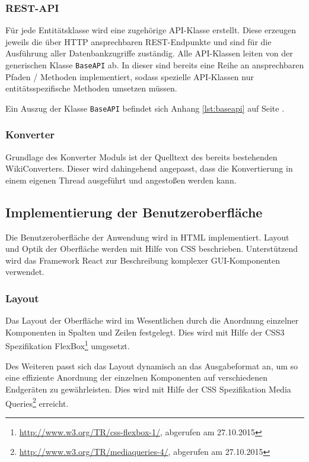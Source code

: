 \documentclass[12pt, xcolor=dvipsnames]{scrartcl}
\begin{document}
\subsubsection*{REST-API}

Für jede Entitätsklasse wird eine zugehörige API-Klasse erstellt. Diese erzeugen jeweils die über HTTP ansprechbaren REST-Endpunkte und sind für die Ausführung aller Datenbankzugriffe zuständig. Alle API-Klassen leiten von der generischen Klasse \texttt{BaseAPI} ab. In dieser sind bereits eine Reihe an ansprechbaren Pfaden / Methoden implementiert, sodass spezielle API-Klassen nur entitätsspezifische Methoden umsetzen müssen.

Ein Auszug der Klasse \texttt{BaseAPI} befindet sich Anhang \ref{lst:baseapi} auf Seite \pageref{lst:baseapi}.

\subsubsection*{Konverter}

Grundlage des Konverter Moduls ist der Quelltext des bereits bestehenden WikiConverters. Dieser wird dahingehend angepasst, dass die Konvertierung in einem eigenen Thread ausgeführt und angestoßen werden kann.

\subsection{Implementierung der Benutzeroberfläche}

Die Benutzeroberfläche der Anwendung wird in HTML implementiert.
Layout und Optik der Oberfläche werden mit Hilfe von CSS beschrieben. 
Unterstützend wird das Framework React zur Beschreibung komplexer GUI-Komponenten verwendet.

\subsubsection*{Layout}

Das Layout der Oberfläche wird im Wesentlichen durch die Anordnung einzelner Komponenten in Spalten und Zeilen festgelegt.
Dies wird mit Hilfe der CSS3 Spezifikation
FlexBox\footnote{\url{http://www.w3.org/TR/css-flexbox-1/}, abgerufen am 27.10.2015} umgesetzt.

Des Weiteren passt sich das Layout dynamisch an das Ausgabeformat an, um so eine effiziente Anordnung der einzelnen Komponenten auf verschiedenen Endgeräten zu gewährleisten. Dies wird mit Hilfe der CSS Spezifikation
Media Queries\footnote{\url{http://www.w3.org/TR/mediaqueries-4/}, abgerufen am 27.10.2015} erreicht.
\end{document}
